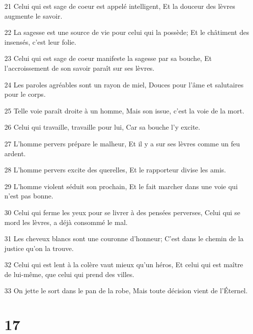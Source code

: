 \par 21 Celui qui est sage de coeur est appelé intelligent, Et la douceur des lèvres augmente le savoir.
\par 22 La sagesse est une source de vie pour celui qui la possède; Et le châtiment des insensés, c'est leur folie.
\par 23 Celui qui est sage de coeur manifeste la sagesse par sa bouche, Et l'accroissement de son savoir paraît sur ses lèvres.
\par 24 Les paroles agréables sont un rayon de miel, Douces pour l'âme et salutaires pour le corps.
\par 25 Telle voie paraît droite à un homme, Mais son issue, c'est la voie de la mort.
\par 26 Celui qui travaille, travaille pour lui, Car sa bouche l'y excite.
\par 27 L'homme pervers prépare le malheur, Et il y a sur ses lèvres comme un feu ardent.
\par 28 L'homme pervers excite des querelles, Et le rapporteur divise les amis.
\par 29 L'homme violent séduit son prochain, Et le fait marcher dans une voie qui n'est pas bonne.
\par 30 Celui qui ferme les yeux pour se livrer à des pensées perverses, Celui qui se mord les lèvres, a déjà consommé le mal.
\par 31 Les cheveux blancs sont une couronne d'honneur; C'est dans le chemin de la justice qu'on la trouve.
\par 32 Celui qui est lent à la colère vaut mieux qu'un héros, Et celui qui est maître de lui-même, que celui qui prend des villes.
\par 33 On jette le sort dans le pan de la robe, Mais toute décision vient de l'Éternel.

\chapter{17}

